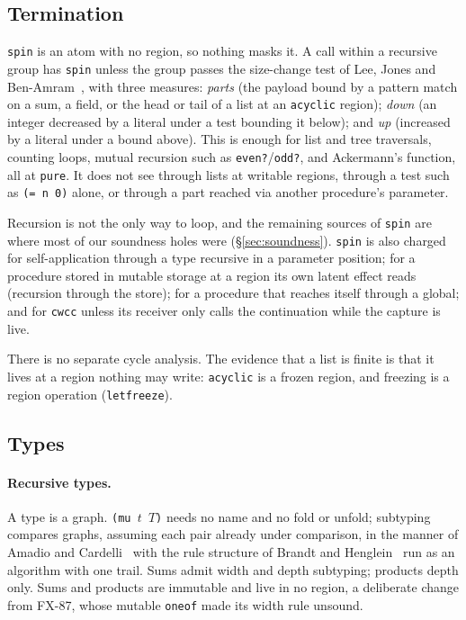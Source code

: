 \documentclass[acmsmall,screen,review]{acmart}
\newcommand{\cd}[1]{\texttt{#1}}
\begin{document}
\subsection{Termination}
\label{sec:spin}

\cd{spin} is an atom with no region, so nothing masks it. A call within
a recursive group has \cd{spin} unless the group passes the size-change
test of Lee, Jones and Ben-Amram~\cite{size-change}, with three
measures: \emph{parts} (the payload bound by a pattern match on a sum, a field, or
the head or tail of a list at an \cd{acyclic} region);
\emph{down} (an integer decreased by a literal under a test bounding it
below); and \emph{up} (increased by a literal under a bound above).
This is enough for list and tree traversals, counting loops, mutual
recursion such as \cd{even?}/\cd{odd?}, and Ackermann's function, all
at \cd{pure}. It does not see through lists at writable regions,
through a test such as \cd{(= n 0)} alone, or through a part reached
via another procedure's parameter.

Recursion is not the only way to loop, and the remaining sources of
\cd{spin} are where most of our soundness holes were
(\S\ref{sec:soundness}). \cd{spin} is also charged for self-application
through a type recursive in a parameter position; for a procedure
stored in mutable storage at a region its own latent effect reads
(recursion through the store); for a procedure that reaches itself through a global;
and for \cd{cwcc} unless its receiver only calls the continuation while
the capture is live.

There is no separate cycle analysis. The evidence that a list is finite
is that it lives at a region nothing may write: \cd{acyclic} is a
frozen region, and freezing is a region operation (\cd{letfreeze}).

\subsection{Types}

\paragraph{Recursive types.} A type is a graph. \cd{(mu $t$ $T$)} needs
no name and no fold or unfold; subtyping compares graphs, assuming each
pair already under comparison, in the manner of Amadio and
Cardelli~\cite{amadio-cardelli} with the rule structure of Brandt and
Henglein~\cite{brandt-henglein} run as an algorithm with one trail.
Sums admit width and depth subtyping; products depth only. Sums and
products are immutable and live in no region, a deliberate change from
FX-87, whose mutable \cd{oneof} made its width rule unsound.
\end{document}
